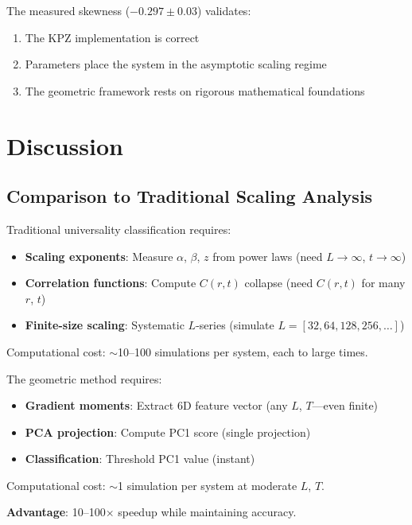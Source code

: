 \documentclass[aps,pre,twocolumn,superscriptaddress,showpacs]{revtex4-2}
\begin{document}
The measured skewness ($-0.297 \pm 0.03$) validates:
\begin{enumerate}
\item The KPZ implementation is correct
\item Parameters place the system in the asymptotic scaling regime
\item The geometric framework rests on rigorous mathematical foundations
\end{enumerate}

\section{Discussion}
\label{sec:discussion}

\subsection{Comparison to Traditional Scaling Analysis}

Traditional universality classification requires:
\begin{itemize}
\item \textbf{Scaling exponents}: Measure $\alpha$, $\beta$, $z$ from power laws (need $L \to \infty$, $t \to \infty$)
\item \textbf{Correlation functions}: Compute $C(r,t)$ collapse (need $C(r,t)$ for many $r$, $t$)
\item \textbf{Finite-size scaling}: Systematic $L$-series (simulate $L = [32, 64, 128, 256, \ldots]$)
\end{itemize}

Computational cost: $\sim$10--100 simulations per system, each to large times.

The geometric method requires:
\begin{itemize}
\item \textbf{Gradient moments}: Extract 6D feature vector (any $L$, $T$---even finite)
\item \textbf{PCA projection}: Compute PC1 score (single projection)
\item \textbf{Classification}: Threshold PC1 value (instant)
\end{itemize}

Computational cost: $\sim$1 simulation per system at moderate $L$, $T$.

\textbf{Advantage}: 10--100$\times$ speedup while maintaining accuracy.
\end{document}
